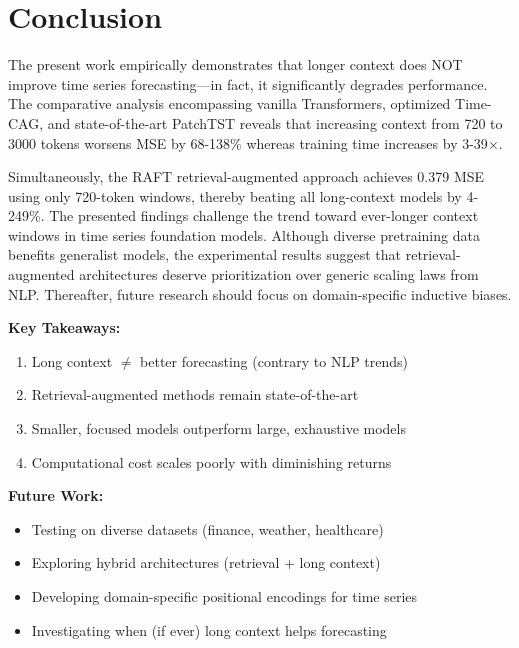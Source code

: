 \documentclass[10pt,twocolumn,letterpaper]{article}
\begin{document}
\section{Conclusion}

The present work empirically demonstrates that longer context does NOT improve time series forecasting---in fact, it significantly degrades performance. The comparative analysis encompassing vanilla Transformers, optimized Time-CAG, and state-of-the-art PatchTST reveals that increasing context from 720 to 3000 tokens worsens MSE by 68-138\% whereas training time increases by 3-39$\times$.

Simultaneously, the RAFT retrieval-augmented approach achieves 0.379 MSE using only 720-token windows, thereby beating all long-context models by 4-249\%. The presented findings challenge the trend toward ever-longer context windows in time series foundation models. Although diverse pretraining data benefits generalist models, the experimental results suggest that retrieval-augmented architectures deserve prioritization over generic scaling laws from NLP. Thereafter, future research should focus on domain-specific inductive biases.

\noindent\textbf{Key Takeaways:}
\begin{enumerate}
    \item Long context $\neq$ better forecasting (contrary to NLP trends)
    \item Retrieval-augmented methods remain state-of-the-art
    \item Smaller, focused models outperform large, exhaustive models
    \item Computational cost scales poorly with diminishing returns
\end{enumerate}

\noindent\textbf{Future Work:}
\begin{itemize}
    \item Testing on diverse datasets (finance, weather, healthcare)
    \item Exploring hybrid architectures (retrieval + long context)
    \item Developing domain-specific positional encodings for time series
    \item Investigating when (if ever) long context helps forecasting
\end{itemize}
\end{document}
